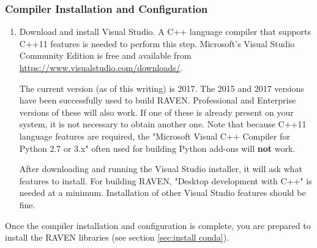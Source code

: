 \begin{enumerate}
\begin{enumerate}
\end{enumerate}


\subsubsection{Compiler Installation and Configuration}
\begin{enumerate}
	\item Download and install Visual Studio.  A C++ language compiler that supports C++11 features
		is needed to perform this step. Microsoft's Visual Studio Community Edition is free and
		available from \url{https://www.visualstudio.com/downloads/}.

		The current version (as of this writing) is 2017. The 2015 and 2017 versions have been
		successfully used to build RAVEN. Professional and Enterprise versions of these will
		also work. If one of these is already present on your system, it is not necessary to
		obtain another one. Note that because C++11 language features are required, the
		"Microsoft Visual C++ Compiler for Python 2.7 or 3.x" often used for building Python
		add-ons will {\bf not} work.

		After downloading and running the Visual Studio installer, it will ask what features
		to install. For building RAVEN, "Desktop development with C++" is needed at a minimum.
		Installation of other Visual Studio features should be fine.
\end{enumerate}

Once the compiler installation and configuration is complete, you are prepared to install the RAVEN libraries
(see section \ref{sec:install conda}).


